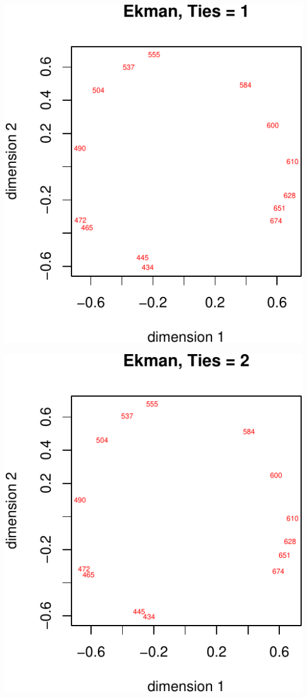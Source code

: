 \documentclass[
  12pt,
]{article}
\begin{document}
\begin{center}\includegraphics{smacofRO_files/figure-latex/plotekmanconfs-1} \end{center}

\begin{center}\includegraphics{smacofRO_files/figure-latex/plotekmanconfs-2} \end{center}
\end{document}
